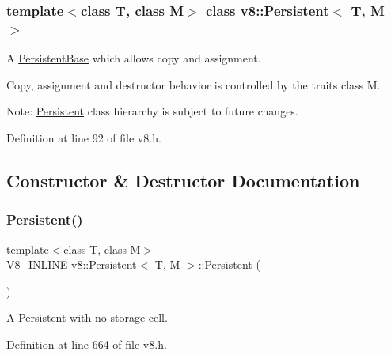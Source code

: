 \subsubsection*{template$<$class T, class M$>$\newline
class v8\+::\+Persistent$<$ T, M $>$}

A \mbox{\hyperlink{classv8_1_1PersistentBase}{Persistent\+Base}} which allows copy and assignment.

Copy, assignment and destructor behavior is controlled by the traits class M.

Note\+: \mbox{\hyperlink{classv8_1_1Persistent}{Persistent}} class hierarchy is subject to future changes. 

Definition at line 92 of file v8.\+h.



\subsection{Constructor \& Destructor Documentation}
\mbox{\label{classv8_1_1Persistent_a5ce14612215393683d814056015a102d}} 
\subsubsection{\texorpdfstring{Persistent()}{Persistent()}\hspace{0.1cm}{\footnotesize\ttfamily [1/4]}}
{\footnotesize\ttfamily template$<$class T, class M$>$ \\
V8\+\_\+\+I\+N\+L\+I\+NE \mbox{\hyperlink{classv8_1_1Persistent}{v8\+::\+Persistent}}$<$ \mbox{\hyperlink{classv8_1_1internal_1_1torque_1_1T}{T}}, M $>$\+::\mbox{\hyperlink{classv8_1_1Persistent}{Persistent}} (\begin{DoxyParamCaption}{ }\end{DoxyParamCaption})\hspace{0.3cm}{\ttfamily [inline]}}

A \mbox{\hyperlink{classv8_1_1Persistent}{Persistent}} with no storage cell. 

Definition at line 664 of file v8.\+h.

\mbox{\label{classv8_1_1Persistent_aabe9a42d7971bd31173bca34186d9ac2}} 
